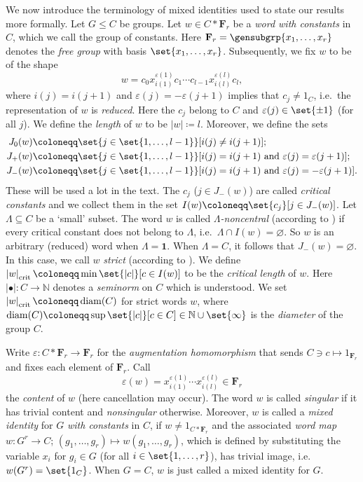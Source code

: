 \documentclass[a4paper,12pt]{amsproc}
\newcommand{\norm}[1]{\left\lvert#1\right\rvert}%
\DeclareMathOperator{\diam}{diam}%
\theoremstyle{plain}
\theoremstyle{definition}
\begin{document}
We now introduce the terminology of mixed identities used to state our results more formally.
Let $G\leq C$ be groups. Let $w\in C\ast\mathbf{F}_r$ be a \emph{word with constants} in $C$, which we call the group of constants. Here $\mathbf{F}_r=\gensubgrp{x_1,\ldots,x_r}$ denotes the \emph{free group} with basis $\set{x_1,\ldots,x_r}$. Subsequently, we fix $w$ to be of the shape
$$
w=c_0x_{i(1)}^{\varepsilon(1)}c_1\cdots c_{l-1}x_{i(l)}^{\varepsilon(l)}c_l,
$$
where $i(j)=i(j+1)$ and $\varepsilon(j)=-\varepsilon(j+1)$ implies that $c_j\neq 1_C$, i.e.\ the representation of $w$ is \emph{reduced}. Here the $c_j$ belong to $C$ and $\varepsilon(j)\in\set{\pm1}$ (for all $j$). We define the \emph{length} of $w$ to be $\norm{w}\coloneqq l$. Moreover, we define the sets 
\begin{align*}
J_0(w)&\coloneqq\set{j\in\set{1,\ldots,l-1}}[i(j)\neq i(j+1)];\\ 
J_+(w)&\coloneqq\set{j\in\set{1,\ldots,l-1}}[i(j)=i(j+1)\text{ and }\varepsilon(j)=\varepsilon(j+1)];\\
J_-(w)&\coloneqq\set{j\in\set{1,\ldots,l-1}}[i(j)=i(j+1)\text{ and }\varepsilon(j)=-\varepsilon(j+1)].
\end{align*}
These will be used a lot in the text. The $c_j$ ($j\in J_-(w)$) are called \emph{critical constants} and we collect them in the set $I(w)\coloneqq\set{c_j}[j\in J_-(w)]$. Let $\Lambda\subseteq C$ be a `small' subset. The word $w$ is called \emph{$\Lambda$-noncentral} (according to \cite{golubchikmikhalev1982generalized}) if every critical constant does not belong to $\Lambda$, i.e.\ $\Lambda\cap I(w)=\varnothing$. So $w$ is an arbitrary (reduced) word when $\Lambda=\mathbf{1}$. When $\Lambda=C$, it follows that $J_-(w)=\varnothing$. In this case, we call $w$ \emph{strict} (according to \cite{tomanov1985generalized}).
We define $\norm{w}_{\rm crit}\coloneqq\min\set{\norm{c}}[c\in I(w)]$ to be the \emph{critical length} of $w$. Here $\norm{\bullet}\colon C\to\mathbb{N}$ denotes a \emph{seminorm} on $C$ which is understood. We set $\norm{w}_{\rm crit}\coloneqq\diam(C)$ for strict words $w$, where $\diam(C)\coloneqq\sup\set{\norm{c}}[c\in C]\in\mathbb{N}\cup\set{\infty}$ is the \emph{diameter} of the group $C$.
	
Write $\varepsilon\colon C\ast\mathbf{F}_r\to\mathbf{F}_r$ for the \emph{augmentation homomorphism} that sends $C\ni c\mapsto 1_{\mathbf{F}_r}$ and fixes each element of $\mathbf{F}_r$. Call 
$$
\varepsilon(w)=x_{i(1)}^{\varepsilon(1)}\cdots x_{i(l)}^{\varepsilon(l)}\in\mathbf{F}_r
$$ 
the \emph{content} of $w$ (here cancellation may occur). The word $w$ is called \emph{singular} if it has trivial content and \emph{nonsingular} otherwise. Moreover, $w$ is called a \emph{mixed identity} for $G$ \emph{with constants} in $C$, if $w\neq 1_{C\ast\mathbf{F}_r}$ and the associated \emph{word map} $w\colon G^r\to C$; $(g_1,\ldots,g_r)\mapsto w(g_1,\ldots,g_r)$, which is defined by substituting the variable $x_i$ for $g_i\in G$ (for all $i\in\set{1,\ldots,r}$), has trivial image, i.e.\ $w(G^r)=\set{1_C}$. When $G=C$, $w$ is just called a mixed identity for $G$.
\end{document}
